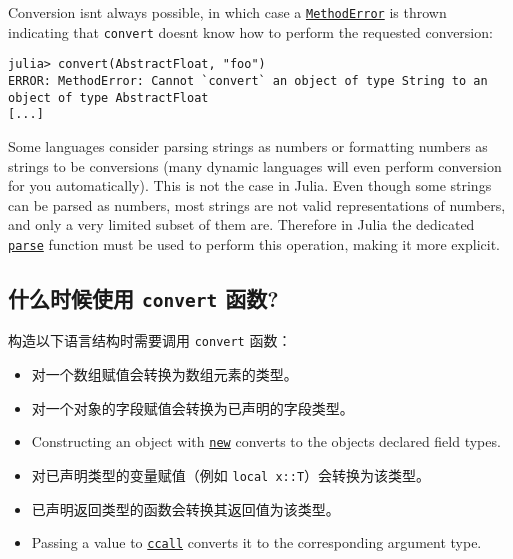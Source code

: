 Conversion isn{\textquotesingle}t always possible, in which case a \hyperlink{68769522931907606}{\texttt{MethodError}} is thrown indicating that \texttt{convert} doesn{\textquotesingle}t know how to perform the requested conversion:




\begin{verbatim}
julia> convert(AbstractFloat, "foo")
ERROR: MethodError: Cannot `convert` an object of type String to an object of type AbstractFloat
[...]
\end{verbatim}



Some languages consider parsing strings as numbers or formatting numbers as strings to be conversions (many dynamic languages will even perform conversion for you automatically). This is not the case in Julia. Even though some strings can be parsed as numbers, most strings are not valid representations of numbers, and only a very limited subset of them are. Therefore in Julia the dedicated \hyperlink{14207407853646164654}{\texttt{parse}} function must be used to perform this operation, making it more explicit.



\hypertarget{7039772400060801175}{}


\subsection{什么时候使用 \texttt{convert} 函数?}



构造以下语言结构时需要调用 \texttt{convert} 函数：



\begin{itemize}
\item 对一个数组赋值会转换为数组元素的类型。


\item 对一个对象的字段赋值会转换为已声明的字段类型。


\item Constructing an object with \hyperlink{13888762393600028594}{\texttt{new}} converts to the object{\textquotesingle}s declared field types.


\item 对已声明类型的变量赋值（例如 \texttt{local x::T}）会转换为该类型。


\item 已声明返回类型的函数会转换其返回值为该类型。


\item Passing a value to \hyperlink{14245046751182637566}{\texttt{ccall}} converts it to the corresponding argument type.

\end{itemize}


